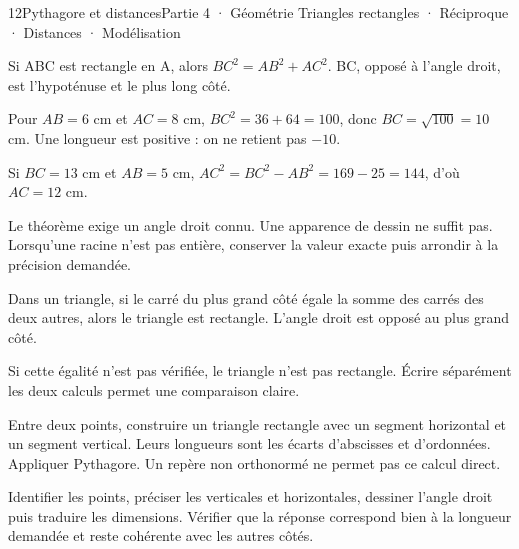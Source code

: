 \begin{ouverture}[geometrie]{12}{Pythagore et distances}{Partie 4 · Géométrie}
{Triangles rectangles · Réciproque · Distances · Modélisation}
\end{ouverture}
\pagestyle{otMain}\essentiel\fontsize{11}{15}\selectfont
{}
\begin{propriete}Si ABC est rectangle en A, alors $BC^2=AB^2+AC^2$. BC, opposé à l’angle droit, est l’hypoténuse et le plus long côté.\end{propriete}
\begin{savoirfaire}Pour $AB=6$ cm et $AC=8$ cm, $BC^2=36+64=100$, donc $BC=\sqrt{100}=10$ cm. Une longueur est positive : on ne retient pas $-10$.\end{savoirfaire}
\begin{savoirfaire}Si $BC=13$ cm et $AB=5$ cm, $AC^2=BC^2-AB^2=169-25=144$, d’où $AC=12$ cm.\end{savoirfaire}
\begin{attention}Le théorème exige un angle droit connu. Une apparence de dessin ne suffit pas. Lorsqu’une racine n’est pas entière, conserver la valeur exacte puis arrondir à la précision demandée.\end{attention}
\clearpage
{}
\begin{propriete}[Réciproque]Dans un triangle, si le carré du plus grand côté égale la somme des carrés des deux autres, alors le triangle est rectangle. L’angle droit est opposé au plus grand côté.\end{propriete}
\begin{propriete}[Contraposée]Si cette égalité n’est pas vérifiée, le triangle n’est pas rectangle. Écrire séparément les deux calculs permet une comparaison claire.\end{propriete}
\begin{savoirfaire}Entre deux points, construire un triangle rectangle avec un segment horizontal et un segment vertical. Leurs longueurs sont les écarts d’abscisses et d’ordonnées. Appliquer Pythagore. Un repère non orthonormé ne permet pas ce calcul direct.\end{savoirfaire}
\begin{savoirfaire}Identifier les points, préciser les verticales et horizontales, dessiner l’angle droit puis traduire les dimensions. Vérifier que la réponse correspond bien à la longueur demandée et reste cohérente avec les autres côtés.\end{savoirfaire}
